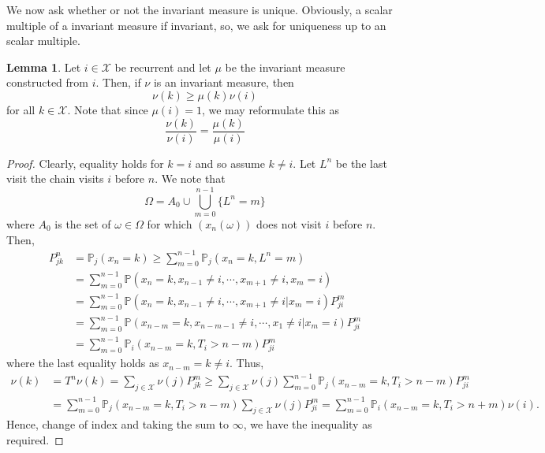 \documentclass[]{article}
\theoremstyle{definition}
\theoremstyle{definition}
\newtheorem{lemma}{Lemma}[section]
\begin{document}
We now ask whether or not the invariant measure is unique. Obviously, a scalar multiple 
of a invariant measure if invariant, so, we ask for uniqueness up to an scalar multiple.

\begin{lemma}
  Let \(i \in \mathcal{X}\) be recurrent and let \(\mu\) be the invariant measure 
  constructed from \(i\). Then, if \(\nu\) is an invariant measure, then 
  \[\nu(k) \ge \mu(k) \nu(i)\]
  for all \(k \in \mathcal{X}\). Note that since \(\mu(i) = 1\), we may reformulate 
  this as 
  \[\frac{\nu(k)}{\nu(i)} = \frac{\mu(k)}{\mu(i)}\]
\end{lemma}
\begin{proof}
  Clearly, equality holds for \(k = i\) and so assume \(k \neq i\). Let \(L^n\) be 
  the last visit the chain visits \(i\) before \(n\). We note that 
  \[\Omega = A_0 \cup \bigcup_{m = 0}^{n - 1} \{L^n = m\}\]
  where \(A_0\) is the set of \(\omega \in \Omega\) for which \((x_n(\omega))\) 
  does not visit \(i\) before \(n\). Then, 
  \[\begin{split}
    P^n_{jk} & = \mathbb{P}_j(x_n = k) \ge \sum_{m = 0}^{n - 1}\mathbb{P}_j(x_n = k, L^n = m)\\
    & = \sum_{m = 0}^{n - 1} \mathbb{P}(x_n = k, x_{n - 1} \neq i, \cdots, x_{m + 1} \neq i, x_m = i)\\
    & = \sum_{m = 0}^{n - 1} \mathbb{P}(x_n = k, x_{n - 1} \neq i, \cdots, x_{m + 1} \neq i | x_m = i) P_{ji}^m\\
    & = \sum_{m = 0}^{n - 1} \mathbb{P}(x_{n - m} = k, x_{n - m - 1} \neq i, \cdots, x_1 \neq i | x_m = i) P_{ji}^m\\
    & = \sum_{m = 0}^{n - 1} \mathbb{P}_i(x_{n - m} = k, T_i > n - m) P_{ji}^m
  \end{split}\]
  where the last equality holds as \(x_{n - m} = k \neq i\). Thus, 
  \[\begin{split}
    \nu(k) & = T^n\nu(k) = \sum_{j \in \mathcal{X}} \nu(j) P_{jk}^m
    \ge \sum_{j \in \mathcal{X}} \nu(j) \sum_{m = 0}^{n - 1} \mathbb{P}_j(x_{n - m} = k, T_i > n - m) P_{ji}^m\\
    & = \sum_{m = 0}^{n - 1} \mathbb{P}_j(x_{n - m} = k, T_i > n - m) \sum_{j \in \mathcal{X}} \nu(j) P_{ji}^m
     = \sum_{m = 0}^{n - 1}\mathbb{P}_i(x_{n - m} = k, T_i > n + m)\nu(i).
  \end{split}\]
  Hence, change of index and taking the sum to \(\infty\), we have the inequality 
  as required.
\end{proof}
\end{document}

